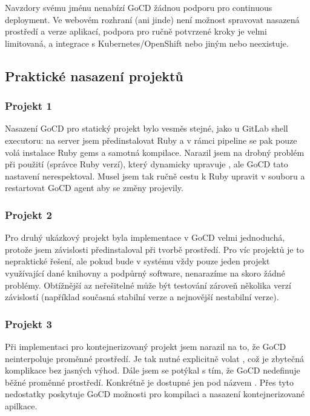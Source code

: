         Navzdory svému jménu nenabízí GoCD žádnou podporu pro continuous deployment. Ve webovém rozhraní (ani jinde) není možnost spravovat nasazená prostředí a verze aplikací, podpora pro ručně potvrzené kroky je velmi limitovaná, a integrace s Kubernetes/OpenShift nebo jiným  nebo neexistuje.

    \subsection{Praktické nasazení projektů}
        \subsubsection{Projekt 1}
            Nasazení GoCD pro statický projekt bylo vesměs stejné, jako u GitLab shell executoru: na server jsem předinstalovat Ruby a v rámci pipeline se pak pouze volá instalace Ruby gems a samotná kompilace. Narazil jsem na drobný problém při použití  (správce Ruby verzí), který dynamicky upravuje , ale GoCD tato nastavení nerespektoval. Musel jsem tak ručně cestu k Ruby upravit v souboru  a restartovat GoCD agent aby se změny projevily.

        \subsubsection{Projekt 2}
            Pro druhý ukázkový projekt byla implementace v GoCD velmi jednoduchá, protože jsem závislosti předinstaloval při tvorbě prostředí. Pro víc projektů je to nepraktické řešení, ale pokud bude v systému vždy pouze jeden projekt využívající dané knihovny a podpůrný software, nenarazíme na skoro žádné problémy. Obtížnější az neřešitelné může být testování zároveň několika verzí závislostí (například současná stabilní verze a nejnovější nestabilní verze).

        \subsubsection{Projekt 3}
            Při implementaci \CI pro kontejnerizovaný projekt jsem narazil na to, že GoCD neinterpoluje proměnné prostředí. Je tak nutné explicitně volat , což je zbytečná komplikace bez jasných výhod. Dále jsem se potýkal s tím, že GoCD nedefinuje běžné proměnné prostředí. Konkrétně  je dostupné jen pod názvem . Přes tyto nedostatky poskytuje GoCD možnosti pro kompilaci a nasazení kontejnerizované apilkace.
